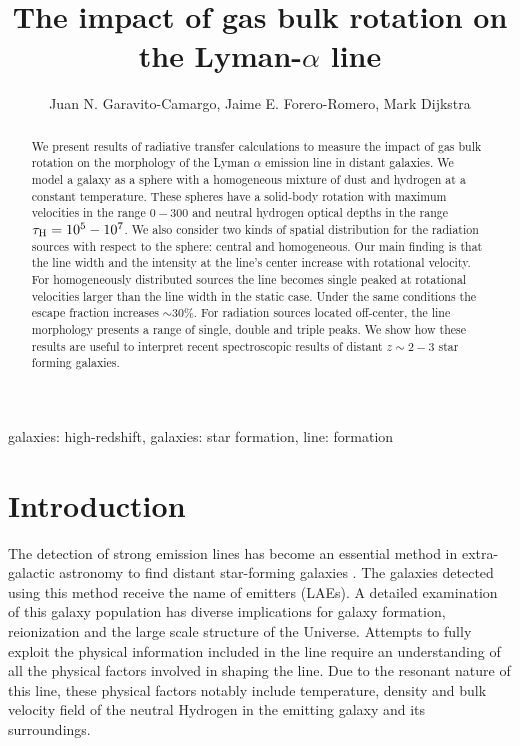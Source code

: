 \documentclass{emulateapj}
\newcommand{\ly}{{\ifmmode{{\rm Ly}\alpha~}\else{Ly$\alpha$~}\fi}}
\newcommand{\kms}{{\ifmmode{{\mathrm{\,km\ s}^{-1}}}\else{\,km~s$^{-1}$}\fi}}
\begin{document}
\title{The impact of gas bulk rotation on the Lyman-$\alpha$ line} 
\author{
  Juan N. Garavito-Camargo,
  Jaime E. Forero-Romero,
  Mark Dijkstra
}


\begin{abstract}

We present results of radiative transfer calculations to measure the
impact of gas bulk rotation on the morphology of the Lyman $\alpha$
emission line in distant galaxies. We model a galaxy as a sphere with
a homogeneous mixture of dust and hydrogen at a constant
temperature. These spheres have a solid-body rotation with maximum
velocities in the range $0-300$ \kms and neutral hydrogen optical
depths in the range $\tau_{\rm H}=10^{5}-10^{7}$. We also consider two
kinds of spatial distribution for the radiation sources with respect
to the sphere: central and homogeneous. Our main finding is that the
line width and the intensity at the line's center increase with
rotational velocity. For homogeneously distributed sources the line
becomes single peaked at rotational velocities larger than the line
width in the static case. Under the same
conditions the escape fraction increases $\sim 30\%$. For radiation
sources located off-center, the line morphology presents a range of
single, double and triple peaks. We show how these results are useful
to interpret recent spectroscopic results of distant $z\sim 2-3$ star
forming galaxies. 

\end{abstract}

\begin{keywords}
{galaxies: high-redshift, galaxies: star formation, line: formation}
\end{keywords}


\section{Introduction}
\label{sec:intro}

The detection of strong \ly emission lines has become an essential
method in extra-galactic astronomy to find distant star-forming
galaxies
\citep{PartridgePeebles,Rhoads00,Gawiser2007,Koehler2007,Ouchi08,Yamada2012,Schenker2012}.
The galaxies detected using this method receive the 
name of \ly emitters (LAEs). A detailed examination of this galaxy
population has diverse implications for galaxy formation, reionization
and the large scale structure of the Universe. Attempts to fully
exploit the physical information included in the \ly line require an
understanding of all the physical factors involved in shaping the
line. Due to the resonant nature of this line, these physical factors
notably include temperature, density and bulk velocity field of the neutral
Hydrogen in the emitting galaxy and its surroundings.
\end{document}

